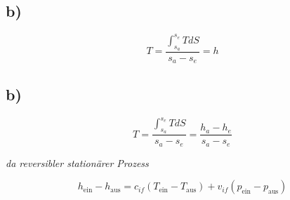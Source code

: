 

\subsection*{b)}

\[
T = \frac{\int_{s_a}^{s_e} T dS}{s_a - s_e} = h
\]



\subsection*{b)}

\[
T = \frac{\int_{s_a}^{s_e} T dS}{s_a - s_e} = \frac{h_a - h_e}{s_a - s_e}
\]

\textit{da reversibler stationärer Prozess}

\[
h_{\text{ein}} - h_{\text{aus}} = c_{if} (T_{\text{ein}} - T_{\text{aus}}) + v_{if} (p_{\text{ein}} - p_{\text{aus}})
\]
